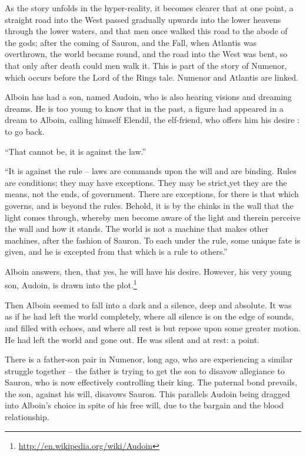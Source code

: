 As the story unfolds in the hyper-reality, it becomes clearer that at one point, a straight road into the West passed gradually upwards into the lower heavens through the lower waters, and that men once walked this road to the abode of the gods; after the coming of Sauron, and the Fall, when Atlantis was overthrown, the world became round, and the road into the West was bent, so that only after death could men walk it. This is part of the story of Numenor, which occurs before the Lord of the Rings tale. Numenor and Atlantis are linked.

Alboin has had a son, named Audoin, who is also hearing visions and dreaming dreams. He is too young to know that in the past, a figure had appeared in a dream to Alboin, calling himself Elendil, the elf-friend, who offers him his desire : to go back.

\begin{quotex}
``That cannot be, it is against the law.''

``It is against the rule -- laws are commands upon the will and are binding. Rules are conditions; they may have exceptions. They may be strict,yet they are the means, not the ends, of government. There are exceptions, for there is that which governs, and is beyond the rules. Behold, it is by the chinks in the wall that the light comes through, whereby men become aware of the light and therein perceive the wall and how it stands. The world is not a machine that makes other machines, after the fashion of Sauron. To each under the rule, some unique fate is given, and he is excepted from that which is a rule to others.''
\end{quotex}


Alboin answers, then, that yes, he will have his desire. However, his very young son, Audoin, is drawn into the plot.\footnote{\url{http://en.wikipedia.org/wiki/Audoin}}

\begin{quotex}
Then Alboin seemed to fall into a dark and a silence, deep and absolute. It was as if he had left the world completely, where all silence is on the edge of sounds, and filled with echoes, and where all rest is but repose upon some greater motion. He had left the world and gone out. He was silent and at rest: a point.
\end{quotex}


There is a father-son pair in Numenor, long ago, who are experiencing a similar struggle together -- the father is trying to get the son to disavow allegiance to Sauron, who is now effectively controlling their king. The paternal bond prevails, the son, against his will, disavows Sauron. This parallels Audoin being dragged into Alboin's choice in spite of his free will, due to the bargain and the blood relationship.


